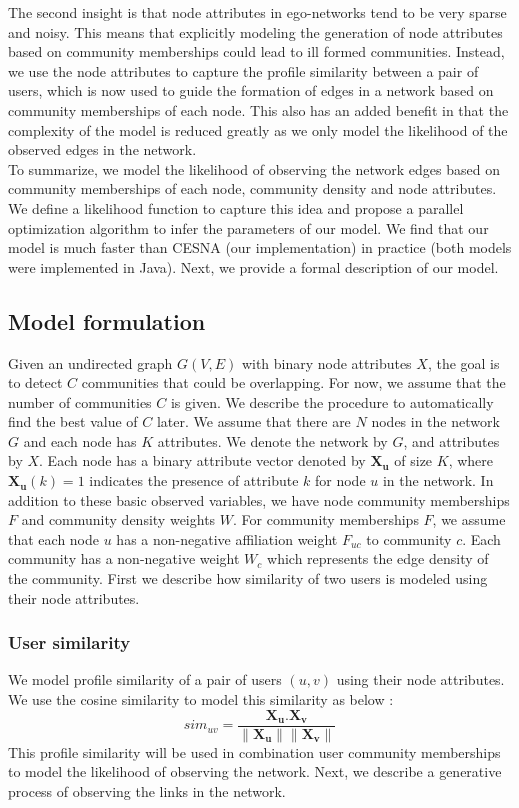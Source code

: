 \documentclass[11pt]{article}
\begin{document}
The second insight is that node attributes in ego-networks tend to be very sparse and noisy. This means that explicitly modeling the generation of node attributes based on community memberships could lead to ill formed communities. Instead, we use the node attributes to capture the profile similarity between a pair of users, which is now used to guide the formation of edges in a network based on community memberships of each node. This also has an added benefit in that the complexity of the model is reduced greatly as we only model the likelihood of the observed edges in the network. \\[3pt]
To summarize, we model the likelihood of observing the network edges based on community memberships of each node, community density and node attributes. We define a likelihood function to capture this idea and propose a parallel optimization algorithm to infer the parameters of our model. We find that our model is much faster than CESNA (our implementation) in practice (both models were implemented in Java).
Next, we provide a formal description of our model. 

\subsection{Model formulation}
Given an undirected graph $G(V,E)$ with binary node attributes $X$,  the goal is to detect $C$ communities that could be overlapping. For now, we assume that the number of communities $C$ is given.  We describe the procedure to automatically find the best value of $C$ later.
We assume that there are $N$ nodes in the network $G$ and each node has $K$ attributes. We denote the network by $G$, and attributes by $X$.
Each node has a binary attribute vector denoted by $\mathbf{X_u}$ of size $K$,  
where $\mathbf{X_u} (k) = 1$ indicates the presence of attribute $k$ for node $u$ in the network. In addition to these basic observed variables, we have node community memberships $F$ and community density weights $W$. For community memberships $F$, we assume that each node $u$ has a non-negative affiliation weight $F_{uc}$ to community $c$. Each community has a non-negative weight $W_c$ which represents the edge density of the community. First we describe how similarity of two users is modeled using their node attributes. 

\subsubsection*{User similarity}
We model profile similarity of a pair of users $(u,v)$ using their node attributes. We use the cosine similarity to model this similarity as below : 
\[ sim_{uv} = \frac{\mathbf{X_u} \textbf{.} \mathbf{X_v} }{\| \mathbf{X_u}\| \|  \mathbf{X_v} \|}\]
This profile similarity will be used in combination user community memberships to model the likelihood of observing the network. Next, we describe a generative process of observing the links in the network.
\end{document}

